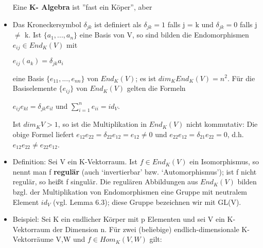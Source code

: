 \begin{itemize}
Eine \textbf{K- Algebra} ist ”fast ein Köper”, aber
\item Das Kroneckersymbol $\delta_{jk}$ ist definiert als $\delta_{jk} = 1$ falls j = k und $\delta_{jk} = 0$ falls j $\neq$ k. Ist $\{a_1,... ,a_n\}$ eine Basis von V, so sind bilden die Endomorphismen $e_{ij} \in End_K (V)$ mit
\begin{center}
$e_{ij}(a_k) = \delta_{jk}a_i$
\end{center}
eine Basis $\{e_{11}, ..., e_{nn}\}$ von $End_K (V)$; es ist $dim_K End_K (V) = n^2$. Für die Basiselemente $\{e_{ij}\}$ von $End_K(V)$ gelten die Formeln
\begin{center}
$e_{ij}e_{kl} = \delta_{jk}e_{il}$ und $\sum\nolimits_{i=1}^{n}e_{ii} = id_V$.
\end{center}
Ist $dim_K V > 1$, so ist die Multiplikation in $End_K (V)$ nicht kommutativ: Die obige Formel liefert $e_{12}e_{22} = \delta_{22}e_{12} = e_{12} \neq 0$ und $e_{22}e_{12} = \delta_{21}e_{22} = 0$, d.h. $e_{12}e_{22} \neq e_{22}e_{12}$.
\item Definition: Sei V ein K-Vektorraum. Ist $f \in End_K(V)$ ein Isomorphismus, so nennt man f \textbf{regulär} (auch ‘invertierbar’ bzw. ‘Automorphismus’); ist f nicht regulär, so heißt f singulär. Die regulären Abbildungen aus $End_K (V)$ bilden bzgl. der Multiplikation von Endomorphismen eine Gruppe mit neutralem Element $id_V$ (vgl. Lemma 6.3); diese Gruppe bezeichnen wir mit GL(V).
\item Beispiel: Sei K ein endlicher Körper mit p Elementen und sei V ein K-Vektorraum der Dimension n. Für zwei (beliebige) endlich-dimensionale K-Vektorräume V,W und $f \in Hom_K(V,W)$ gilt: \\

\end{itemize}
